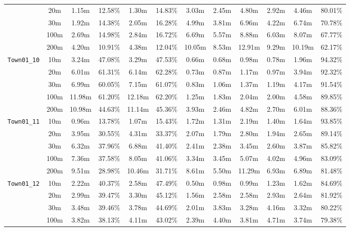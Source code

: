 \begin{table}
{\begin{tabular}{@{}cccccccccccc@{}}
      & 20m & 1.15m & 12.58\% & 1.30m & 14.83\% & 3.03m & 2.45m & 4.80m & 2.92m & 4.46m & 80.01\% \\
      & 30m & 1.92m & 14.38\% & 2.05m & 16.28\% & 4.99m & 3.81m & 6.96m & 4.22m & 6.74m & 70.78\% \\
      & 100m & 2.69m & 14.98\% & 2.84m & 16.72\% & 6.69m & 5.57m & 8.88m & 6.03m & 8.07m & 67.77\% \\
      & 200m & 4.20m & 10.91\% & 4.38m & 12.04\% & 10.05m & 8.53m & 12.91m & 9.29m & 10.19m & 62.17\% \\
      \midrule
      \multirow{5}{*}{\Verb|Town01_10|} & 10m & 3.24m & 47.08\% & 3.29m & 47.53\% & 0.66m & 0.68m & 0.98m & 0.78m & 1.96m & 94.32\% \\
      & 20m & 6.01m & 61.31\% & 6.14m & 62.28\% & 0.73m & 0.87m & 1.17m & 0.97m & 3.94m & 92.32\% \\
      & 30m & 6.99m & 60.05\% & 7.15m & 61.07\% & 0.83m & 1.06m & 1.37m & 1.19m & 4.17m & 91.54\% \\
      & 100m & 11.98m & 61.20\% & 12.18m & 62.20\% & 1.25m & 1.83m & 2.04m & 2.00m & 4.58m & 89.85\% \\
      & 200m & 10.98m & 44.63\% & 11.14m & 45.36\% & 3.93m & 2.46m & 4.82m & 2.70m & 6.01m & 88.36\% \\
      \midrule
      \multirow{5}{*}{\Verb|Town01_11|} & 10m & 0.96m & 13.78\% & 1.07m & 15.43\% & 1.72m & 1.31m & 2.19m & 1.40m & 1.64m & 93.85\% \\
      & 20m & 3.95m & 30.55\% & 4.31m & 33.37\% & 2.07m & 1.79m & 2.80m & 1.94m & 2.65m & 89.14\% \\
      & 30m & 6.32m & 37.96\% & 6.88m & 41.40\% & 2.41m & 2.38m & 3.45m & 2.60m & 3.87m & 85.82\% \\
      & 100m & 7.36m & 37.58\% & 8.05m & 41.06\% & 3.34m & 3.45m & 5.07m & 4.02m & 4.96m & 83.09\% \\
      & 200m & 9.51m & 28.98\% & 10.46m & 31.71\% & 8.61m & 5.50m & 11.29m & 6.93m & 6.89m & 81.48\% \\
      \midrule
      \multirow{5}{*}{\Verb|Town01_12|} & 10m & 2.22m & 40.37\% & 2.58m & 47.49\% & 0.50m & 0.98m & 0.99m & 1.23m & 1.62m & 84.69\% \\
      & 20m & 2.99m & 39.47\% & 3.30m & 45.12\% & 1.56m & 2.58m & 2.58m & 2.93m & 2.64m & 81.92\% \\
      & 30m & 3.48m & 39.46\% & 3.78m & 44.69\% & 2.01m & 3.83m & 3.28m & 4.16m & 3.32m & 80.22\% \\
      & 100m & 3.82m & 38.13\% & 4.11m & 43.02\% & 2.39m & 4.40m & 3.81m & 4.71m & 3.74m & 79.38\% \\

\end{tabular}}
\end{table}
